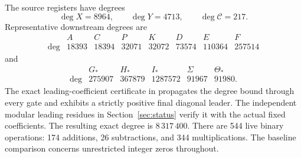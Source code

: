 The source registers have degrees
\[
 \deg X=8964,\qquad\deg Y=4713,\qquad\deg\mathcal C=217.
\]
Representative downstream degrees are
\[
\begin{array}{c|rrrrrrr}
 &A&C&P&K&D&E&F\\\hline
\deg&18393&18394&32071&32072&73574&110364&257514
\end{array}
\]
and
\[
\begin{array}{c|rrrrr}
 &G_*&H_*&I_*&\Sigma&\Theta_*\\\hline
\deg&275907&367879&1287572&91967&91980.
\end{array}
\]
The exact leading-coefficient certificate in
 propagates the degree bound
through every gate and exhibits a strictly positive final diagonal
leader.  The independent modular leading residues in
Section~\ref{sec:status} verify it with the actual fixed coefficients.
The resulting exact degree is \(8\,317\,400\).  There are 544 live
binary operations: 174 additions, 26 subtractions, and 344 multiplications.
The baseline comparison concerns unrestricted integer zeros throughout.
